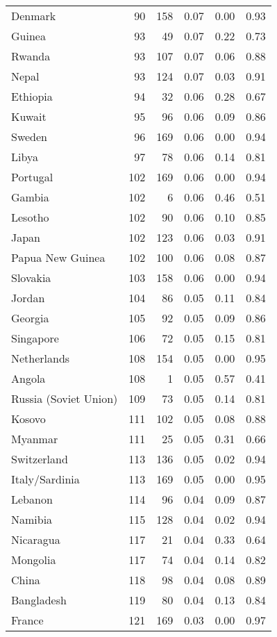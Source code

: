 \begin{longtable}[t]{lrrrrr}
Denmark & 90 & 158 & 0.07 & 0.00 & 0.93\\
\addlinespace
Guinea & 93 & 49 & 0.07 & 0.22 & 0.73\\
Rwanda & 93 & 107 & 0.07 & 0.06 & 0.88\\
Nepal & 93 & 124 & 0.07 & 0.03 & 0.91\\
Ethiopia & 94 & 32 & 0.06 & 0.28 & 0.67\\
Kuwait & 95 & 96 & 0.06 & 0.09 & 0.86\\
\addlinespace
Sweden & 96 & 169 & 0.06 & 0.00 & 0.94\\
Libya & 97 & 78 & 0.06 & 0.14 & 0.81\\
Portugal & 102 & 169 & 0.06 & 0.00 & 0.94\\
Gambia & 102 & 6 & 0.06 & 0.46 & 0.51\\
Lesotho & 102 & 90 & 0.06 & 0.10 & 0.85\\
\addlinespace
Japan & 102 & 123 & 0.06 & 0.03 & 0.91\\
Papua New Guinea & 102 & 100 & 0.06 & 0.08 & 0.87\\
Slovakia & 103 & 158 & 0.06 & 0.00 & 0.94\\
Jordan & 104 & 86 & 0.05 & 0.11 & 0.84\\
Georgia & 105 & 92 & 0.05 & 0.09 & 0.86\\
\addlinespace
Singapore & 106 & 72 & 0.05 & 0.15 & 0.81\\
Netherlands & 108 & 154 & 0.05 & 0.00 & 0.95\\
Angola & 108 & 1 & 0.05 & 0.57 & 0.41\\
Russia (Soviet Union) & 109 & 73 & 0.05 & 0.14 & 0.81\\
Kosovo & 111 & 102 & 0.05 & 0.08 & 0.88\\
\addlinespace
Myanmar & 111 & 25 & 0.05 & 0.31 & 0.66\\
Switzerland & 113 & 136 & 0.05 & 0.02 & 0.94\\
Italy/Sardinia & 113 & 169 & 0.05 & 0.00 & 0.95\\
Lebanon & 114 & 96 & 0.04 & 0.09 & 0.87\\
Namibia & 115 & 128 & 0.04 & 0.02 & 0.94\\
\addlinespace
Nicaragua & 117 & 21 & 0.04 & 0.33 & 0.64\\
Mongolia & 117 & 74 & 0.04 & 0.14 & 0.82\\
China & 118 & 98 & 0.04 & 0.08 & 0.89\\
Bangladesh & 119 & 80 & 0.04 & 0.13 & 0.84\\
France & 121 & 169 & 0.03 & 0.00 & 0.97\\

\end{longtable}
